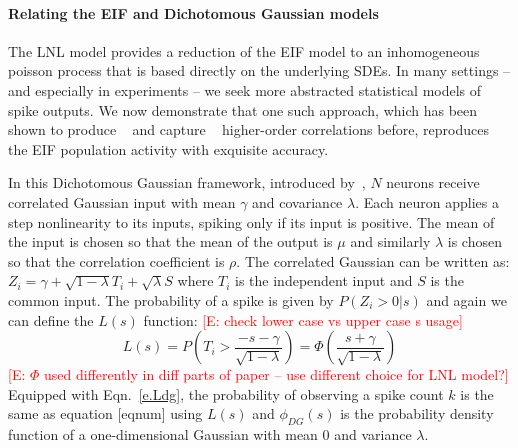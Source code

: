 \documentclass[%
 reprint,
 amsmath,amssymb,
 aps,
floatfix,
]{revtex4-1}
\newcommand{\Ecomment}[1]{\textcolor{red}{[E: #1]}}
\begin{document}
%
%




\paragraph*{Relating the EIF and Dichotomous Gaussian models}

The LNL model provides a reduction of the EIF model to an inhomogeneous poisson process that is based directly on the underlying SDEs.  In many settings -- and especially in experiments -- we seek more abstracted statistical models of spike outputs.  We now demonstrate that one such approach, which has been shown to produce ~\cite{Amari,Macke} and capture ~\cite{Yu} higher-order correlations before, reproduces the EIF population activity with exquisite accuracy.  

In this Dichotomous Gaussian framework, introduced by~\cite{Amari,Macke}, $N$ neurons receive correlated Gaussian input with mean $\gamma$ and covariance $\lambda$. Each neuron applies a step nonlinearity to its inputs, spiking only if its input is positive. The mean of the input is chosen so that the mean of the output is $\mu$ and similarly $\lambda$ is chosen so that the correlation coefficient is $\rho$.
The correlated Gaussian can be written as: $Z_i = \gamma + \sqrt{1-\lambda} T_i + \sqrt{\lambda} S$ where $T_i$ is the independent input and $S$ is the common input. The probability of a spike is given by $P(Z_i > 0 | s)$ and again we can define the $L(s)$ function:  \Ecomment{check lower case vs upper case s usage}
\begin{equation}
L(s) = P\left( T_i > \frac{-s-\gamma}{\sqrt{1-\lambda}} \right) = \Phi\left(\frac{s+\gamma}{\sqrt{1-\lambda}}\right)
\label{e.Ldg}
\end{equation}
\Ecomment{$\Phi$ used differently in diff parts of paper -- use different choice for LNL model?}
Equipped with Eqn.~\eqref{e.Ldg}, the probability of observing a spike count $k$ is the same as equation [eqnum] using $L(s)$ and $\phi_{DG}(s)$ is the probability density function of a one-dimensional Gaussian with mean $0$ and variance $\lambda$.
\end{document}
